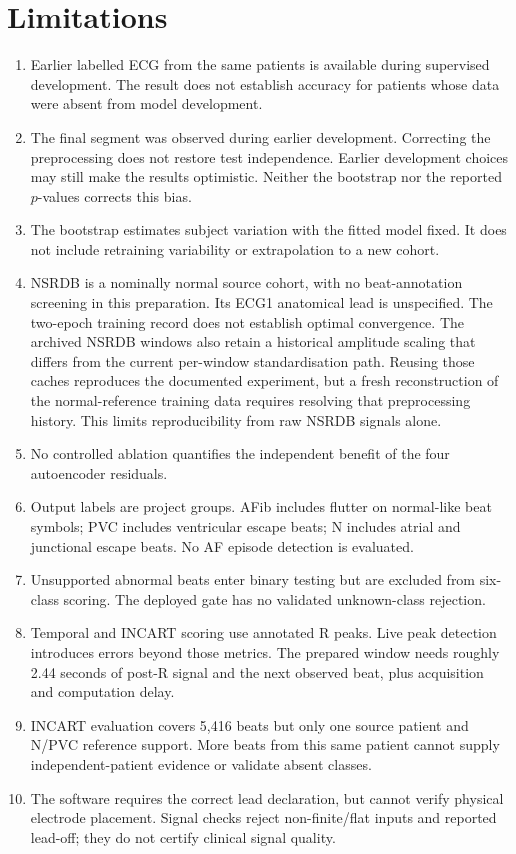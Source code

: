 \section{Limitations}
\begin{enumerate}[itemsep=0.1\baselineskip]
\item Earlier labelled ECG from the same patients is available during
supervised development. The result does not establish accuracy for patients whose data were absent
from model development.
\item The final segment was observed during earlier development. Correcting
the preprocessing does not restore test independence. Earlier development
choices may still make the results optimistic. Neither the bootstrap nor the
reported $p$-values corrects this bias.
\item The bootstrap estimates subject variation with the fitted model fixed.
It does not include retraining variability or extrapolation to a new cohort.
\item NSRDB is a nominally normal source cohort, with no beat-annotation
screening in this preparation. Its ECG1 anatomical lead is unspecified.
The two-epoch training record does not establish optimal convergence.
The archived NSRDB windows also retain a historical amplitude scaling that
differs from the current per-window standardisation path. Reusing those
caches reproduces the documented experiment, but a fresh reconstruction of
the normal-reference training data requires resolving that preprocessing
history. This limits reproducibility from raw NSRDB signals alone.
\item No controlled ablation quantifies the independent benefit of the
four autoencoder residuals.
\item Output labels are project groups. AFib includes flutter on normal-like
beat symbols; PVC includes ventricular escape beats; N includes atrial and
junctional escape beats. No AF episode detection is evaluated.
\item Unsupported abnormal beats enter binary testing but are excluded from
six-class scoring. The deployed gate has no validated unknown-class rejection.
\item Temporal and INCART scoring use annotated R peaks. Live peak detection
introduces errors beyond those metrics. The prepared window needs roughly
2.44 seconds of post-R signal and the next observed beat, plus acquisition
and computation delay.
\item INCART evaluation covers 5,416 beats but only one source patient and
N/PVC reference support. More beats from this same patient cannot supply
independent-patient evidence or validate absent classes.
\item The software requires the correct lead declaration, but cannot verify
physical electrode placement. Signal checks reject non-finite/flat inputs and
reported lead-off; they do not certify clinical signal quality.
\end{enumerate}

